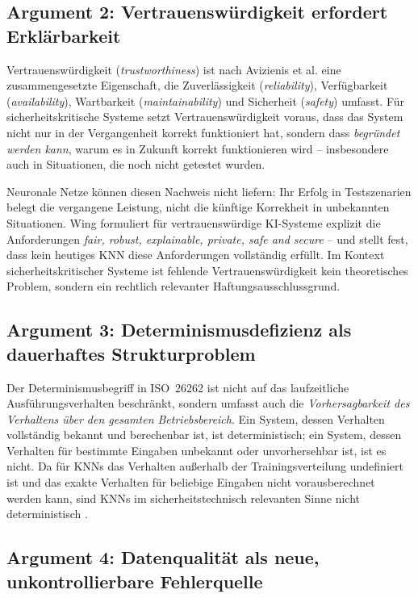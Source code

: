 ﻿\documentclass[12pt,a4paper]{article}
\begin{document}
\subsection{Argument 2: Vertrauensw\"urdigkeit erfordert Erkl\"arbarkeit}
\label{subsec:arg2}

Vertrauensw\"urdigkeit (\emph{trustworthiness}) ist nach Avizienis et al.
\cite{Avizienis2004} eine zusammengesetzte Eigenschaft, die Zuverl\"assigkeit
(\emph{reliability}), Verf\"ugbarkeit (\emph{availability}), Wartbarkeit
(\emph{maintainability}) und Sicherheit (\emph{safety}) umfasst. F\"ur sicherheitskritische
Systeme setzt Vertrauensw\"urdigkeit voraus, dass das System nicht nur in der
Vergangenheit korrekt funktioniert hat, sondern dass \emph{begr\"undet werden kann},
warum es in Zukunft korrekt funktionieren wird -- insbesondere auch in Situationen,
die noch nicht getestet wurden.

Neuronale Netze k\"onnen diesen Nachweis nicht liefern: Ihr Erfolg in
Testszenarien belegt die vergangene Leistung, nicht die k\"unftige Korrekheit
in unbekannten Situationen. Wing \cite{Wing2021} formuliert f\"ur vertrauensw\"urdige
KI-Systeme explizit die Anforderungen \emph{fair, robust, explainable, private,
safe and secure} -- und stellt fest, dass kein heutiges KNN diese Anforderungen
vollst\"andig erf\"ullt. Im Kontext sicherheitskritischer Systeme ist fehlende
Vertrauensw\"urdigkeit kein theoretisches Problem, sondern ein rechtlich relevanter
Haftungsausschlussgrund.

\subsection{Argument 3: Determinismusdefizienz als dauerhaftes Strukturproblem}
\label{subsec:arg3}

Der Determinismusbegriff in ISO~26262 ist nicht auf das laufzeitliche
Ausf\"uhrungsverhalten beschr\"ankt, sondern umfasst auch die
\emph{Vorhersagbarkeit des Verhaltens \"uber den gesamten Betriebsbereich}. Ein
System, dessen Verhalten vollst\"andig bekannt und berechenbar ist, ist deterministisch;
ein System, dessen Verhalten f\"ur bestimmte Eingaben unbekannt oder unvorhersehbar ist,
ist es nicht. Da f\"ur KNNs das Verhalten au\ss{}erhalb der Trainingsverteilung
undefiniert ist und das exakte Verhalten f\"ur beliebige Eingaben nicht
vorausberechnet werden kann, sind KNNs im sicherheitstechnisch relevanten Sinne
nicht deterministisch \cite{Dreossi2019}.

\subsection{Argument 4: Datenqualit\"at als neue, unkontrollierbare Fehlerquelle}
\label{subsec:arg4}
\end{document}
